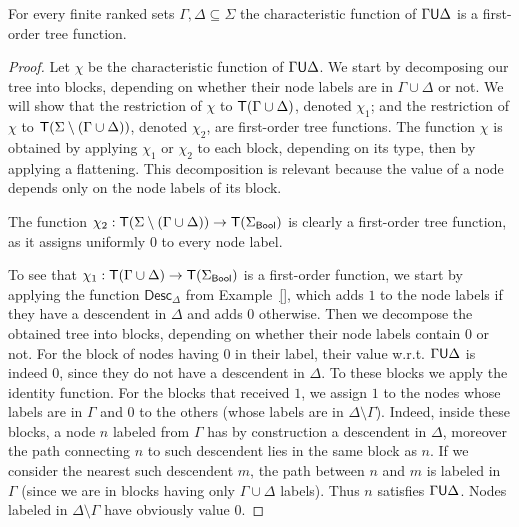\begin{lemma}\label{lem:untilmod}
    For every finite ranked sets $\Gamma, \Delta \subseteq \Sigma$  the characteristic function of $\Gamma \mathsf U \Delta$ is a first-order tree function.
\end{lemma}
\begin{proof}
Let $\chi$ be the characteristic function of $\Gamma \mathsf U \Delta$.
We start by decomposing our tree into blocks, depending on whether their node labels are in $\Gamma\cup\Delta$ or not. We will show that the restriction of $\chi$ to $\mathsf T (\Gamma\cup\Delta)$, denoted $\chi_1$; and the restriction of $\chi$ to $\mathsf T (\Sigma\setminus(\Gamma\cup\Delta))$, denoted $\chi_2$, are first-order tree functions. The function $\chi$ is obtained by applying $\chi_1$ or $\chi_2$ to each block, depending on its type, then by applying a flattening.
This decomposition is relevant because the value of a node depends only on the node labels of its block. %

The function $\chi_2:\mathsf T (\Sigma\setminus(\Gamma\cup\Delta))\to \mathsf T(\Sigma_{\sf{Bool}})$ is clearly a first-order tree function, as it assigns uniformly $0$ to every node label. 

To see that $\chi_1:\mathsf T (\Gamma\cup\Delta)\to \mathsf T(\Sigma_{\sf{Bool}})$ 
is a first-order function, we start by applying the function $\mathsf{Desc}_\Delta$ from
Example~\ref{}, which adds $1$ to the node labels if they have a descendent in $\Delta$ and adds $0$ otherwise. Then we decompose the obtained tree into blocks, depending on whether their node labels contain $0$ or not. For the block of nodes having $0$ in their label, their value w.r.t. $\Gamma\mathsf U \Delta$ is indeed $0$, since they do not have a descendent in $\Delta$. To these blocks we apply the identity function. For the blocks that received $1$, we assign $1$ to the nodes whose labels are in  $\Gamma$ and $0$ to the others (whose labels are in $\Delta\setminus\Gamma$). Indeed, inside these blocks, a node $n$ labeled from $\Gamma$ has by construction a descendent in $\Delta$, moreover the path connecting $n$ to such descendent lies in the same block as $n$. If we consider the nearest such descendent $m$, the path between $n$ and $m$  is labeled in $\Gamma$ (since we are in blocks having only $\Gamma\cup\Delta$ labels). Thus $n$ satisfies $\Gamma\mathsf U\Delta$. Nodes labeled in $\Delta\setminus\Gamma$ have obviously value $0$.      
\end{proof}


